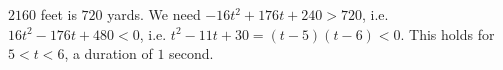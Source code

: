 $2160$ feet is $720$ yards. We need $-16t^2+176t+240>720$, i.e. $16t^2-176t+480<0$, i.e. $t^2-11t+30=(t-5)(t-6)<0$. This holds for $5<t<6$, a duration of $\boxed{1}$ second.
